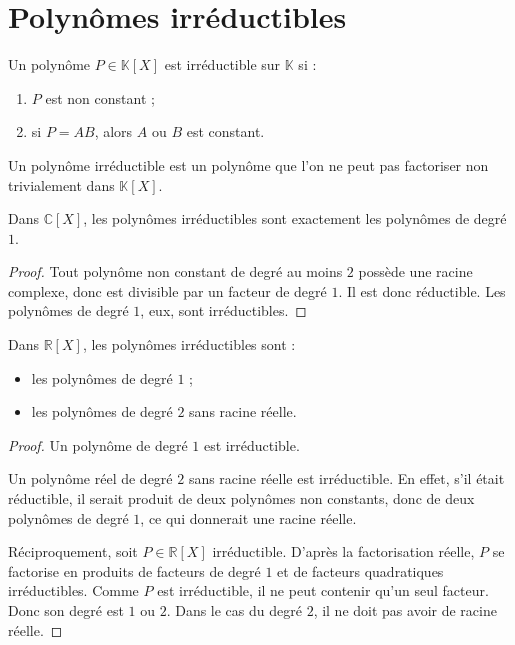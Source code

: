 \documentclass[11pt,a4paper]{article}
\newcommand{\K}{\mathbb K}
\newcommand{\R}{\mathbb R}
\newcommand{\C}{\mathbb C}
\begin{document}
\section{Polynômes irréductibles}

\begin{definitionbox}
Un polynôme \(P\in\K[X]\) est irréductible sur \(\K\) si :
\begin{enumerate}
    \item \(P\) est non constant ;
    \item si \(P=AB\), alors \(A\) ou \(B\) est constant.
\end{enumerate}
\end{definitionbox}

\begin{retenirbox}
Un polynôme irréductible est un polynôme que l'on ne peut pas factoriser non trivialement dans \(\K[X]\).
\end{retenirbox}

\begin{theorembox}
Dans \(\C[X]\), les polynômes irréductibles sont exactement les polynômes de degré \(1\).
\end{theorembox}

\begin{proof}
Tout polynôme non constant de degré au moins \(2\) possède une racine complexe, donc est divisible par un facteur de degré \(1\).  
Il est donc réductible.  
Les polynômes de degré \(1\), eux, sont irréductibles.
\end{proof}

\begin{theorembox}
Dans \(\R[X]\), les polynômes irréductibles sont :
\begin{itemize}
    \item les polynômes de degré \(1\) ;
    \item les polynômes de degré \(2\) sans racine réelle.
\end{itemize}
\end{theorembox}

\begin{proof}
Un polynôme de degré \(1\) est irréductible.

Un polynôme réel de degré \(2\) sans racine réelle est irréductible.  
En effet, s'il était réductible, il serait produit de deux polynômes non constants, donc de deux polynômes de degré \(1\), ce qui donnerait une racine réelle.

Réciproquement, soit \(P\in\R[X]\) irréductible.  
D'après la factorisation réelle, \(P\) se factorise en produits de facteurs de degré \(1\) et de facteurs quadratiques irréductibles.  
Comme \(P\) est irréductible, il ne peut contenir qu'un seul facteur.  
Donc son degré est \(1\) ou \(2\).  
Dans le cas du degré \(2\), il ne doit pas avoir de racine réelle.
\end{proof}
\end{document}
